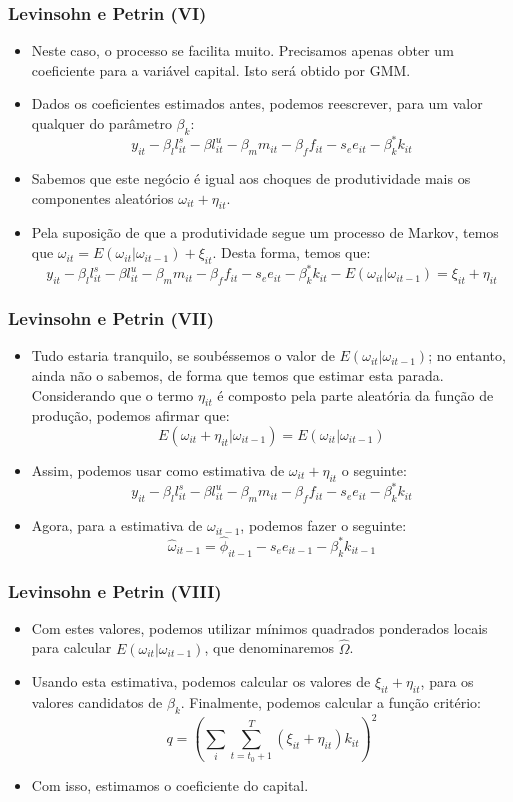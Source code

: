 \documentclass{beamer}
\begin{document}
\begin{frame}\frametitle{Levinsohn e Petrin (VI)}

\begin{itemize}
\item Neste caso, o processo se facilita muito. Precisamos apenas obter
um coeficiente para a variável capital. Isto será obtido por GMM. 
\item Dados os coeficientes estimados antes, podemos reescrever, para um
valor qualquer do parâmetro $\beta_{k}$:
\[
y_{it}-\beta_{l}l_{it}^{s}-\beta l_{it}^{u}-\beta_{m}m_{it}-\beta_{f}f_{it}-s_{e}e_{it}-\beta_{k}^{*}k_{it}
\]
\item Sabemos que este negócio é igual aos choques de produtividade mais
os componentes aleatórios $\omega_{it}+\eta_{it}$. 
\item Pela suposição de que a produtividade segue um processo de Markov,
temos que $\omega_{it}=E(\omega_{it}|\omega_{it-1})+\xi_{it}$. Desta
forma, temos que:
\[
y_{it}-\beta_{l}l_{it}^{s}-\beta l_{it}^{u}-\beta_{m}m_{it}-\beta_{f}f_{it}-s_{e}e_{it}-\beta_{k}^{*}k_{it}-E(\omega_{it}|\omega_{it-1})=\xi_{it}+\eta_{it}
\]
\end{itemize}
\end{frame}

\begin{frame}\frametitle{Levinsohn e Petrin (VII)}

\begin{itemize}
\item Tudo estaria tranquilo, se soubéssemos o valor de $E(\omega_{it}|\omega_{it-1})$;
no entanto, ainda não o sabemos, de forma que temos que estimar esta
parada. Considerando que o termo $\eta_{it}$ é composto pela parte
aleatória da função de produção, podemos afirmar que:
\[
E(\omega_{it}+\eta_{it}|\omega_{it-1})=E(\omega_{it}|\omega_{it-1})
\]
\item Assim, podemos usar como estimativa de $\omega_{it}+\eta_{it}$ o
seguinte:
\[
y_{it}-\beta_{l}l_{it}^{s}-\beta l_{it}^{u}-\beta_{m}m_{it}-\beta_{f}f_{it}-s_{e}e_{it}-\beta_{k}^{*}k_{it}
\]
\item Agora, para a estimativa de $\omega_{it-1}$, podemos fazer o seguinte:
\[
\hat{\omega}_{it-1}=\hat{\phi}_{it-1}-s_{e}e_{it-1}-\beta_{k}^{*}k_{it-1}
\]
\end{itemize}
\end{frame}

\begin{frame}\frametitle{Levinsohn e Petrin (VIII)}

\begin{itemize}
\item Com estes valores, podemos utilizar mínimos quadrados ponderados locais
para calcular $E(\omega_{it}|\omega_{it-1})$, que denominaremos $\hat{\Omega}$.
\item Usando esta estimativa, podemos calcular os valores de $\xi_{it}+\eta_{it}$,
para os valores candidatos de $\beta_{k}$. Finalmente, podemos calcular
a função critério:
\[
q=\left(\sum_{i}\sum_{t=t_{0}+1}^{T}(\xi_{it}+\eta_{it})k_{it}\right)^{2}
\]
\item Com isso, estimamos o coeficiente do capital.
\end{itemize}
\end{frame}
\end{document}
